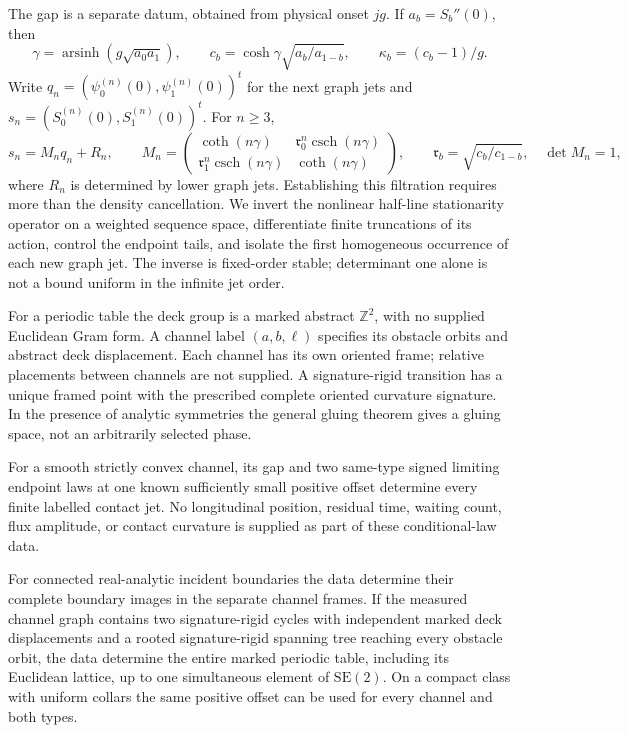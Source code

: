 The gap is a separate datum, obtained from physical onset \(jg\).  If
\(a_b=S_b''(0)\), then
\[
 \gamma=\operatorname{arsinh}(g\sqrt{a_0a_1}),\qquad
 c_b=\cosh\gamma\sqrt{a_b/a_{1-b}},\qquad
 \kappa_b=(c_b-1)/g.
\]
Write \(q_n=(\psi_0^{(n)}(0),\psi_1^{(n)}(0))^t\) for the next graph
jets and \(s_n=(S_0^{(n)}(0),S_1^{(n)}(0))^t\).  For \(n\ge3\),
\begin{equation}\label{eq:v25-intro-jet-block}
 s_n=M_nq_n+R_n,\qquad
 M_n=\begin{pmatrix}
 \coth(n\gamma)&\mathfrak r_0^n\operatorname{csch}(n\gamma)\\
 \mathfrak r_1^n\operatorname{csch}(n\gamma)&\coth(n\gamma)
 \end{pmatrix},\qquad
 \mathfrak r_b=\sqrt{c_b/c_{1-b}},\quad\det M_n=1,
\end{equation}
where \(R_n\) is determined by lower graph jets.  Establishing this
filtration requires more than the density cancellation.  We invert the
nonlinear half-line stationarity operator on a weighted sequence space,
differentiate finite truncations of its action, control the endpoint tails,
and isolate the first homogeneous occurrence of each new graph jet.
The inverse is fixed-order stable; determinant one alone is not a bound
uniform in the infinite jet order.

For a periodic table the deck group is a marked abstract \(\mathbb Z^2\),
with no supplied Euclidean Gram form.  A channel label \((a,b,\ell)\)
specifies its obstacle orbits and abstract deck displacement.  Each channel
has its own oriented frame; relative placements between channels are not
supplied.  A signature-rigid transition has a unique framed point with the
prescribed complete oriented curvature signature.  In the presence of
analytic symmetries the general gluing theorem gives a gluing space, not
an arbitrarily selected phase.

\begin{theorem}
\label{thm:v26-intro-rigidity}
\label{thm:v25-intro-rigidity}
For a smooth strictly convex channel, its gap and two same-type signed
limiting endpoint laws at one known sufficiently small positive offset
 determine every finite labelled contact jet.  No longitudinal position,
residual time, waiting count, flux amplitude, or contact curvature is
supplied as part of these conditional-law data.

For connected real-analytic incident boundaries the data determine their
complete boundary images in the separate channel frames.  If the measured
channel graph contains two signature-rigid cycles with independent marked
deck displacements and a rooted signature-rigid spanning tree reaching
every obstacle orbit, the data determine the entire marked periodic table,
including its Euclidean lattice, up to one simultaneous element of
\(\mathrm{SE}(2)\).  On a compact class with uniform collars the same
positive offset can be used for every channel and both types.
\end{theorem}


